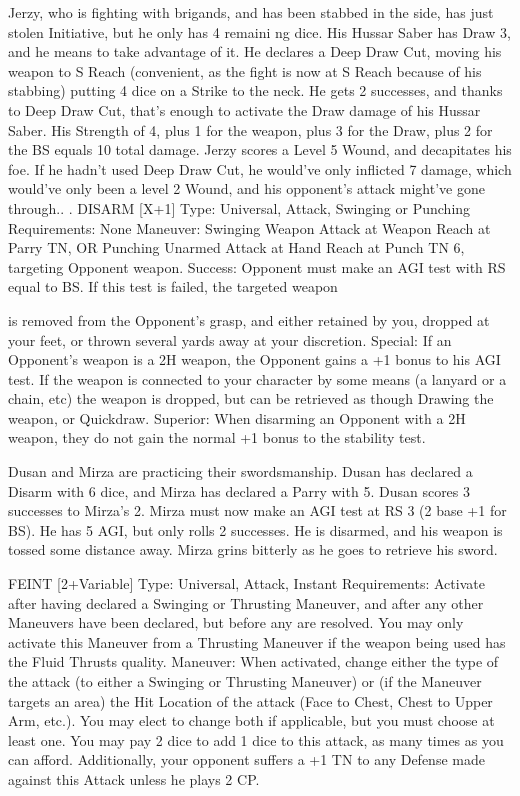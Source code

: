 \documentclass[oneside,11pt,english]{book}
\begin{document}
 
Jerzy, who is fighting with brigands, and has been stabbed in the side, has just stolen Initiative, but he only has 4 remaini ng dice. 
His Hussar Saber has Draw 3, and he means to take advantage of it. He declares a Deep Draw Cut, moving his weapon to S 
Reach (convenient, as the fight is now at S Reach because of his stabbing) putting 4 dice on a Strike to the neck. He gets 2 
successes, and thanks to Deep Draw Cut, that’s enough to activate the Draw damage of his Hussar Saber. His Strength of 4, plus 
1 for the weapon, plus 3 for the Draw, plus 2 for the BS equals 10 total damage. Jerzy scores a Level 5 Wound, and decapitates 
his foe. If he hadn’t used Deep Draw Cut, he would’ve only inflicted 7 damage, which would’ve only been a level 2 Wound, and 
his opponent’s attack might’ve gone through.. 
. 
DISARM [X+1] 
Type: Universal, Attack, Swinging or Punching 
Requirements: None 
Maneuver: Swinging Weapon Attack at Weapon Reach at Parry TN, OR Punching Unarmed Attack at 
Hand Reach at Punch TN 6, targeting Opponent weapon. 
Success: Opponent must make an AGI test with RS equal to BS. If this test is failed, the targeted weapon 


is removed from the Opponent's grasp, and either retained by you, dropped at your feet, or thrown several 
yards away at your discretion. 
Special: If an Opponent’s weapon is a 2H weapon, the Opponent gains a +1 bonus to his AGI test. 
 If the weapon is connected to your character by some means (a lanyard or a chain, etc) the weapon is 
dropped, but can be retrieved as though Drawing the weapon, or Quickdraw. 
Superior: When disarming an Opponent with a 2H weapon, they do not gain the normal +1 bonus to the 
stability test. 

 
Dusan and Mirza are practicing their swordsmanship. Dusan has declared a Disarm with 6 dice, and Mirza has declared a 
Parry with 5. Dusan scores 3 successes to Mirza’s 2. Mirza must now make an AGI test at RS 3 (2 base +1 for BS). He has 5 
AGI, but only rolls 2 successes. He is disarmed, and his weapon is tossed some distance away. Mirza grins bitterly as he goes to 
retrieve his sword. 
 
FEINT [2+Variable] 
Type: Universal, Attack, Instant 
Requirements: Activate after having declared a Swinging or Thrusting Maneuver, and after any other 
Maneuvers have been declared, but before any are resolved. You may only activate this Maneuver from a 
Thrusting Maneuver if the weapon being used has the Fluid Thrusts quality. 
Maneuver: When activated, change either the type of the attack (to either a Swinging or Thrusting 
Maneuver) or (if the Maneuver targets an area) the Hit Location of the attack (Face to Chest, Chest to 
Upper Arm, etc.). You may elect to change both if applicable, but you must choose at least one. You may 
pay 2 dice to add 1 dice to this attack, as many times as you can afford. 
Additionally, your opponent suffers a +1 TN to any Defense made against this Attack unless he plays 2 
CP. 
\end{document}
